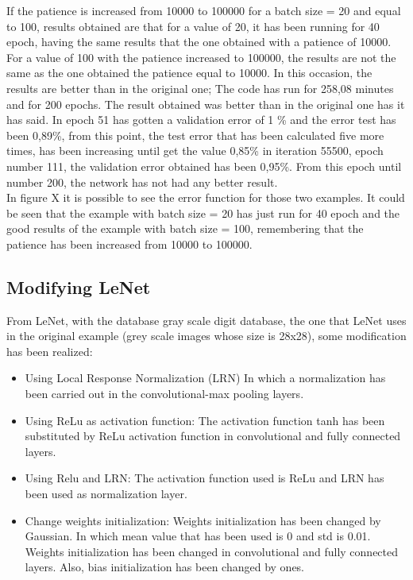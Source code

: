 If the patience is increased from 10000 to 100000 for a batch size = 20 and equal to 100, results obtained are that for a value of 20, it has been running for 40 epoch, having the same results that the one obtained with a patience of 10000.\\

 For a value of 100 with the patience increased to 100000, the results are not the same as the one obtained the patience equal to 10000. In this occasion, the results are better than in the original one; The code has run for 258,08 minutes and for 200 epochs. The result obtained was better than in the original one has it has said. In epoch 51 has gotten a validation error of  1 \% and the error test has been 0,89\%, from this point, the test error that has been calculated five more times, has been increasing until get the value 0,85\% in iteration 55500, epoch number 111, the validation error obtained has been 0,95\%. From this epoch until number 200, the network has not had any better result.\\

In figure X it is possible to see the error function for those two examples. It could be seen that the example with batch size = 20 has just run for 40 epoch and the good results of the example with batch size = 100, remembering that the patience has been increased from 10000 to 100000.\\

\clearpage
\subsection{Modifying LeNet}
From LeNet, with the database gray scale digit database, the one that LeNet uses in the original example (grey scale images whose size is 28x28), some modification has been realized:\\

\begin{itemize}
\item{Using Local Response Normalization (LRN) In which a normalization has been carried out in the convolutional-max pooling layers.}
\item{Using ReLu as activation function:} The activation function tanh has been substituted by ReLu activation function in convolutional and fully connected layers.
\item{Using Relu and LRN}: The activation function used is ReLu and LRN has been used as  normalization layer.
\item{Change weights initialization}: Weights initialization has been changed by Gaussian. In which mean value that has been used is 0 and std is 0.01. Weights initialization has been changed in convolutional and fully connected layers. Also, bias initialization has been changed by ones.
\end{itemize}

